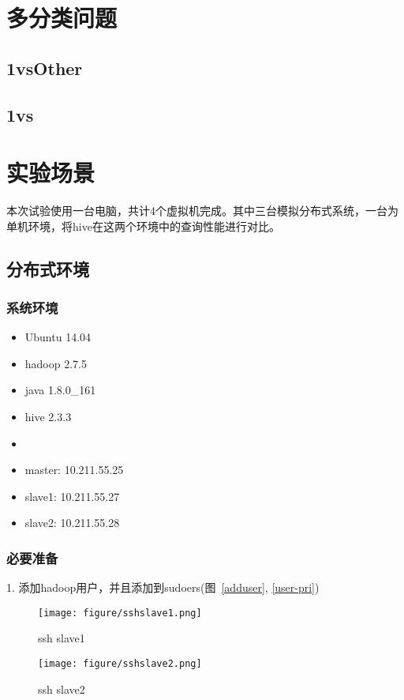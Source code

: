 \documentclass[UTF8]{article}
\begin{document}
\section{多分类问题}
\subsection{1vsOther}
\subsection{1vs}







\section{实验场景}
本次试验使用一台电脑，共计4个虚拟机完成。其中三台模拟分布式系统，一台为单机环境，将hive在这两个环境中的查询性能进行对比。
\subsection{分布式环境}\label{hadoop1}
\subsubsection{系统环境}
\begin{itemize}
	\item[] Ubuntu 14.04 
	\item[] hadoop 2.7.5 
	\item[] java 1.8.0\_161 
	\item[] hive 2.3.3
	\item[] 
	\item[] master: 10.211.55.25
	\item[] slave1: 10.211.55.27
	\item[] slave2: 10.211.55.28
\end{itemize}

\subsubsection{必要准备}

1. 添加hadoop用户，并且添加到sudoers(图~\ref{adduser}, \ref{user-pri})


\begin{figure*}[htb]\centering
\begin{minipage}[t]{0.48\textwidth}
\centering
\texttt{[image: figure/sshslave1.png]}
\caption{ssh slave1}\label{ssh-slave1}
\end{minipage}
\begin{minipage}[t]{0.48\textwidth}
\centering
\texttt{[image: figure/sshslave2.png]}
\caption{ssh slave2}\label{ssh-slave2}
\end{minipage}
\end{figure*}
\end{document}
